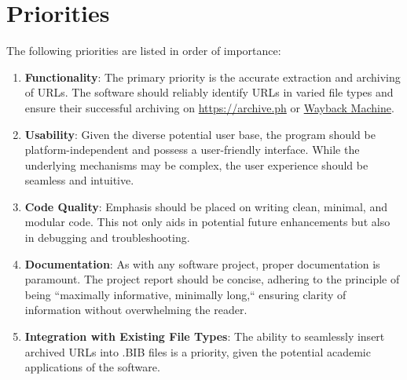 \section{Priorities}
The following priorities are listed in order of importance:
\begin{enumerate}
    \item \textbf{Functionality}: The primary priority is the accurate extraction and archiving of URLs. The software should reliably identify URLs in varied file types and ensure their successful archiving on \href{https://archive.ph}{https://archive.ph} or \href{https://web.archive.org/save/}{Wayback Machine}.
    \item \textbf{Usability}: Given the diverse potential user base, the program should be platform-independent and possess a user-friendly interface. While the underlying mechanisms may be complex, the user experience should be seamless and intuitive.
    \item \textbf{Code Quality}: Emphasis should be placed on writing clean, minimal, and modular code. This not only aids in potential future enhancements but also in debugging and troubleshooting.
    \item \textbf{Documentation}: As with any software project, proper documentation is paramount. The project report should be concise, adhering to the principle of being ``maximally informative, minimally long,`` ensuring clarity of information without overwhelming the reader.
    \item \textbf{Integration with Existing File Types}: The ability to seamlessly insert archived URLs into .BIB files is a priority, given the potential academic applications of the software.
\end{enumerate}